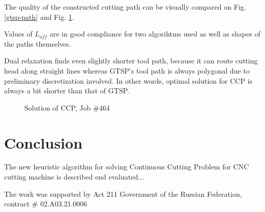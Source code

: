 \documentclass{ifacconf}
\begin{document}
The quality of the constructed
cutting path can be visually compared
on Fig. \ref{gtsp-path} and Fig. \ref{ccp-path}.

Values of $L_{off}$ are in good compliance for two algorihtms used
as well as shapes of the paths themselves.

Dual relaxation finds even slightly shorter tool path,
because it can route cutting head along straight lines
whereas GTSP's tool path is always polygonal
due to preliminary discretization involved.
In other words,
optimal solution for CCP is always a bit shorter
than that of GTSP.

\begin{figure}
  \caption{Solution of CCP, Job \#464}
  \label{ccp-path}
\end{figure}

\section{Conclusion}

The new heuristic algorithm
for solving
Continuous Cutting Problem
for CNC cutting machine
is described end evaluated...

\begin{ack}
The work was supported by Act 211 Government of the Russian Federation,
contract \# 02.A03.21.0006
\end{ack}

\end{document}
